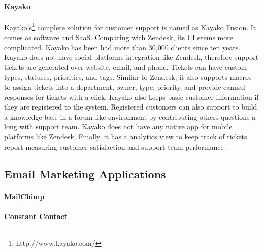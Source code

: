 \paragraph{Kayako}
Kayako's\footnote{http://www.kayako.com/} complete solution for customer support is named as Kayako Fusion. It comes as software and \ac{SaaS}. Comparing with Zendesk, its \ac{UI} seems more complicated. Kayako has been had more than 30,000 clients since ten years. Kayako does not have social platforms integration like Zendesk, therefore support tickets are generated over website, email, and phone. Tickets can have custom types, statuses, priorities, and tags. Similar to Zendesk, it also supports macros to assign tickets into a department, owner, type, priority, and provide canned responses for tickets with a click. Kayako also keeps basic customer information if they are registered to the system. Registered customers can also support to build a knowledge base in a forum-like environment by contributing others questions a long with support team. Kayako does not have any native app for mobile platforms like Zendesk. Finally, it has a analytics view to keep track of tickets report measuring customer satisfaction and support team performance \citep{KayakoInc.2013,KayakoInc.2013a}.

\subsection{Email Marketing Applications}
\label{subsec:3.1.3:EmaiMarktAppl}


\paragraph{MailChimp}

\paragraph{Constant Contact}

